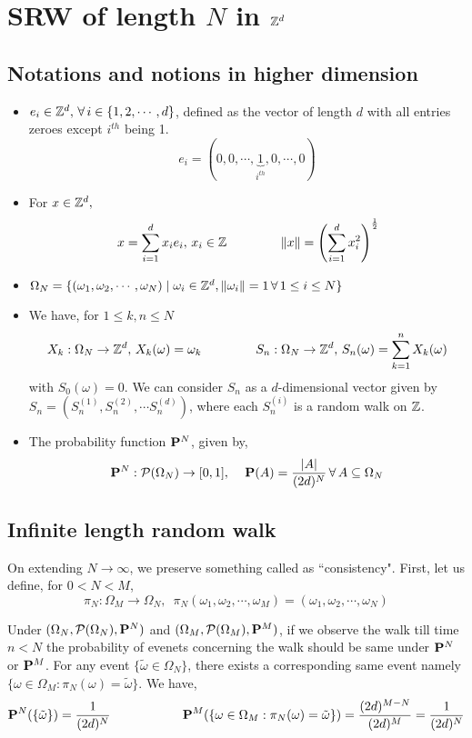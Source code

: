 \documentclass[main]{subfiles}
\begin{document}
\section{SRW of length $N$ in $\Z^d$}
\subsection{Notations and notions in higher dimension}
\begin{itemize}
    \item $e_i \in \Z^d,\, \forall\,i \in \{1,2,\cdots,d\}$, defined as the vector of length $d$ with all entries zeroes except $i^{th}$ being 1.
          $$e_i = (0,0,\cdots,\underbrace{1}_{i^{th}},0,\cdots,0)$$
    \item For $x \in \Z^d,$
          $$\,x = \sum\limits_{i=1}^{d}x_{i}e_{i},\,x_i \in \Z\hspace{1.5cm}\lVert x \rVert = \left(\sum\limits_{i=1}^{d}x_{i}^{2}\right)^{\frac{1}{2}}$$
    \item $\Omega_N = \{(\omega_1,\omega_2,\cdots,\omega_N) \mid \omega_i \in \Z^d, \lVert \omega_i \rVert  = 1\,\forall\,1 \leq i \leq N\}$
    \item We have, for $1\leq k,n \leq N$ $$X_k : \Omega_N \to \Z^d,\,X_{k}(\omega) = \omega_k \hspace{1.5cm} S_n : \Omega_N \to \Z^d,\,S_n(\omega) = \sum\limits_{k=1}^n X_k(\omega)$$
          with $ S_{0}(\omega)=0 $. We can consider $S_n$ as a $d$-dimensional vector given by $S_n = \left(S_n^{(1)},S_n^{(2)},\cdots S_n^{(d)}\right)$, where each $S_n^{(i)}$ is a random walk on $\Z$.
    \item The probability function $\P^N$, given by,
          $$ \P^N : \mathcal{P}(\Omega_N) \to [0,1],\,\,\,\,\,\,\,\P(A) = \frac{|A|}{(2d)^N}\,\forall\,A \subseteq \Omega_N$$
\end{itemize}
\subsection{Infinite length random walk}
On extending $N \to \infty$, we preserve something called as ``consistency". First, let us define, for $0<N<M$,
$$\pi_N : \Omega_M \to \Omega_N,\,\,\,\pi_N(\omega_1,\omega_2,\cdots,\omega_M) = (\omega_1,\omega_2,\cdots,\omega_N)$$

Under $(\Omega_N,\mathcal{P}(\Omega_N),\P^N)$ and $(\Omega_M,\mathcal{P}(\Omega_M),\P^M)$, if we observe the walk till time $n < N$ the probability of evenets concerning the walk should be same under $\P^N$ or $\P^M$. For any event $\{\tilde{\omega} \in \Omega_N\}$, there exists a corresponding same event namely $\{\omega \in \Omega_M : \pi_N(\omega) = \tilde{\omega}\}.$ We have,
$$\P^N(\{\tilde{\omega}\}) = \frac{1}{(2d)^N} \hspace{2cm} \P^M(\{\omega \in \Omega_M : \pi_N(\omega) = \tilde{\omega}\}) = \frac{(2d)^{M-N}}{(2d)^M} = \frac{1}{(2d)^N}$$
\end{document}
